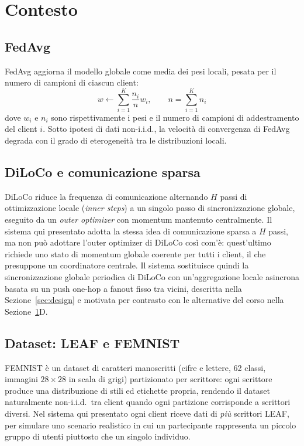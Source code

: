 \section{Contesto}
\label{sec:background}

\subsection{FedAvg}
FedAvg aggiorna il modello globale come media dei
pesi locali, pesata per il numero di campioni di ciascun client:
\begin{equation}
  w \leftarrow \sum_{i=1}^{K} \frac{n_i}{n} w_i, \qquad n = \sum_{i=1}^{K} n_i
  \label{eq:fedavg}
\end{equation}
dove $w_i$ e $n_i$ sono rispettivamente i pesi e il numero di campioni di
addestramento del client $i$. Sotto ipotesi di dati non-i.i.d., la velocità di
convergenza di FedAvg degrada con il grado di eterogeneità tra le
distribuzioni locali.

\subsection{DiLoCo e comunicazione sparsa}
DiLoCo riduce la frequenza di comunicazione
alternando $H$ passi di ottimizzazione locale (\emph{inner steps}) a un
singolo passo di sincronizzazione globale, eseguito da un \emph{outer
optimizer} con momentum mantenuto centralmente. Il sistema qui presentato
adotta la stessa idea di comunicazione sparsa a $H$ passi, ma non può
adottare l'outer optimizer di DiLoCo così com'è: quest'ultimo richiede uno
stato di momentum globale coerente per tutti i client, il che presuppone
un coordinatore centrale. Il sistema sostituisce
quindi la sincronizzazione globale periodica di DiLoCo con un'aggregazione
locale asincrona basata su un push one-hop a fanout fisso tra vicini,
descritta nella Sezione~\ref{sec:design} e motivata per contrasto con le
alternative del corso nella Sezione~\ref{sec:background}D.

\subsection{Dataset: LEAF e FEMNIST}
FEMNIST è un dataset di caratteri manoscritti (cifre e
lettere, 62 classi, immagini $28\times28$ in scala di grigi) partizionato per
scrittore: ogni scrittore produce una distribuzione di stili ed etichette
propria, rendendo il dataset naturalmente non-i.i.d.\ tra client quando ogni
partizione corrisponde a scrittori diversi. Nel sistema qui presentato ogni
client riceve dati di \emph{più} scrittori LEAF, per simulare
uno scenario realistico in cui un partecipante rappresenta un piccolo gruppo
di utenti piuttosto che un singolo individuo.

